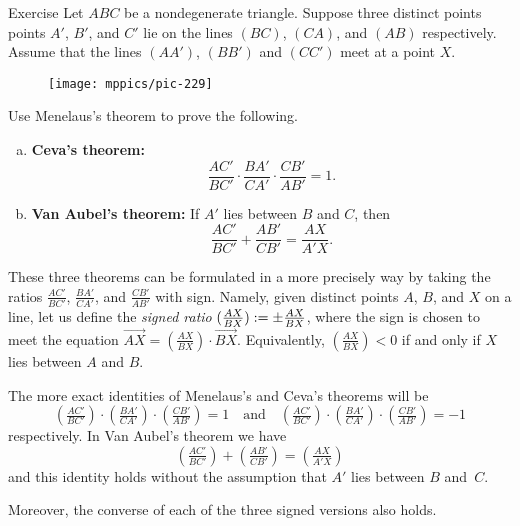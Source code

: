 {

\begin{thm}{Exercise}\label{thm:ceva-affine}\label{ex:ceva-affine}
Let $ABC$ be a nondegenerate triangle.
Suppose three distinct points points $A'$, $B'$, and $C'$ lie on the lines $(BC)$, $(CA)$, and $(AB)$ respectively.
Assume that the lines $(AA')$, $(BB')$ and $(CC')$ meet at a point $X$.

\begin{wrapfigure}{r}{31mm}
\centering
\vskip-2mm
\texttt{[image: mppics/pic-229]}
\end{wrapfigure}

Use Menelaus's theorem to prove the following.

\begin{enumerate}[(a)]
\item {}\textbf{Ceva's theorem:}
\[\frac{AC'}{BC'}\cdot\frac{BA'}{CA'}\cdot \frac{CB'}{AB'}=1.\]
\item {}\textbf{Van Aubel's theorem:} If $A'$ lies between $B$ and $C$, then
\[\frac{AC'}{BC'}+\frac{AB'}{CB'}=\frac{AX}{A'X}.\]
\end{enumerate}
\end{thm}

}

These three theorems can be formulated in a more precisely way by taking the ratios $\frac{AC'}{BC'}$, $\frac{BA'}{CA'}$, and $\frac{CB'}{AB'}$ with sign.
Namely, given distinct points $A$, $B$, and $X$ on a line, let us define the \emph{signed ratio} $(\frac{AX}{BX}):=\pm\frac{AX}{BX}$, where the sign is chosen to meet the equation
$\overrightarrow{AX}=\left(\frac{AX}{BX}\right)\cdot \overrightarrow{BX}$.
Equivalently, $(\frac{AX}{BX})<0$ if and only if $X$ lies between $A$ and $B$.

The more exact identities of Menelaus's and Ceva's theorems will be
\[\left(\tfrac{AC'}{BC'}\right)\cdot\left(\tfrac{BA'}{CA'}\right)\cdot \left(\tfrac{CB'}{AB'}\right)=1
\quad\text{and}\quad
\left(\tfrac{AC'}{BC'}\right)\cdot\left(\tfrac{BA'}{CA'}\right)\cdot \left(\tfrac{CB'}{AB'}\right)=-1
\]
respectively.
In Van Aubel's theorem we have
\[\left(\tfrac{AC'}{BC'}\right)+\left(\tfrac{AB'}{CB'}\right)=\left(\tfrac{AX}{A'X}\right)\]
and this identity holds without the assumption that $A'$ lies between $B$ and~$C$.

Moreover, the converse of each of the three signed versions also holds.

